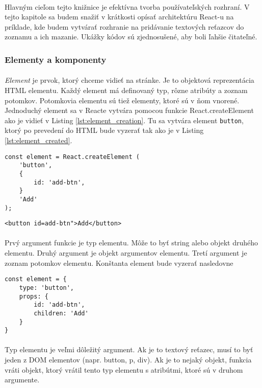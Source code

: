 \paragraph{}
Hlavným cieľom tejto knižnice je efektívna tvorba používateľských rozhraní. V tejto kapitole sa budem snažiť v krátkosti opísať architektúru React-u na príklade, kde budem vytvárať rozhranie na pridávanie textových reťazcov do zoznamu a ich mazanie. Ukážky kódov sú zjednosušené, aby boli ľahšie čitateľné.

\subsubsection{Elementy a komponenty}
\paragraph{}
\emph{Element} je prvok, ktorý chceme vidieť na stránke. Je to objektová reprezentácia HTML elementu. Každý element má definovaný typ, rôzne atribúty a zoznam potomkov. Potomkovia elementu sú tiež elementy, ktoré sú v ňom vnorené. Jednoduchý element sa v Reacte vytvára pomocou funkcie React.createElement ako je vidieť v Listing \ref{lst:element_creation}. Tu sa vytvára element \texttt{button}, ktorý po prevedení do HTML bude vyzerať tak ako je v Listing \ref{lst:element_created}.
\begin{lstlisting}[caption={Vytvorenie jednoduchého elementu}, label={lst:element_creation}]
const element = React.createElement (
    'button',
    {
        id: 'add-btn',
    }
    'Add'
);
\end{lstlisting}
\begin{lstlisting}[caption={Element vypísaný ako HTML}, label={lst:element_created}]
<button id=add-btn">Add</button>
\end{lstlisting}
\paragraph{}
Prvý argument funkcie je typ elementu. Môže to byť string alebo objekt druhého elementu. Druhý argument je objekt argumentov elementu. Tretí argument je zoznam potomkov elementu. Konštanta element bude vyzerať nasledovne
\begin{lstlisting}
const element = {
    type: 'button',
    props: {
        id: 'add-btn',
        children: 'Add'
    }
}
\end{lstlisting}
\paragraph{}
Typ elementu je veľmi dôležitý argument. Ak je to textový reťazec, musí to byť jeden z DOM elementov (napr. button, p, div). Ak je to nejaký objekt, funkcia vráti objekt, ktorý vrátil tento typ elementu s atribútmi, ktoré sú v druhom argumente.

